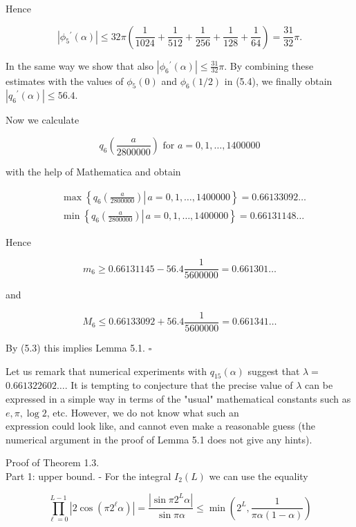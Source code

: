\documentclass[10pt]{article}
\begin{document}
Hence

$$
\left|\phi_{5}{ }^{\prime}(\alpha)\right| \leqslant 32 \pi\left(\frac{1}{1024}+\frac{1}{512}+\frac{1}{256}+\frac{1}{128}+\frac{1}{64}\right)=\frac{31}{32} \pi .
$$

In the same way we show that also $\left|\phi_{6}{ }^{\prime}(\alpha)\right| \leqslant \frac{31}{32} \pi$. By combining these estimates with the values of $\phi_{5}(0)$ and $\phi_{6}(1 / 2)$ in (5.4), we finally obtain $\left|q_{6}{ }^{\prime}(\alpha)\right| \leqslant 56.4$.

Now we calculate

$$
q_{6}\left(\frac{a}{2800000}\right) \text { for } a=0,1, \ldots, 1400000
$$

with the help of Mathematica and obtain

$$
\begin{aligned}
& \max \left\{\left.q_{6}\left(\frac{a}{2800000}\right) \right\rvert\, a=0,1, \ldots, 1400000\right\}=0.66133092 \ldots \\
& \min \left\{\left.q_{6}\left(\frac{a}{2800000}\right) \right\rvert\, a=0,1, \ldots, 1400000\right\}=0.66131148 \ldots
\end{aligned}
$$

Hence

$$
m_{6} \geqslant 0.66131145-56.4 \frac{1}{5600000}=0.661301 \ldots
$$

and

$$
M_{6} \leqslant 0.66133092+56.4 \frac{1}{5600000}=0.661341 \ldots
$$

By (5.3) this implies Lemma 5.1. \(\square\)

Let us remark that numerical experiments with $q_{15}(\alpha)$ suggest that $\lambda=$ $0.661322602 \ldots$. It is tempting to conjecture that the precise value of $\lambda$ can be expressed in a simple way in terms of the "usual" mathematical constants such as $e, \pi, \log 2$, etc. However, we do not know what such an\\
expression could look like, and cannot even make a reasonable guess (the numerical argument in the proof of Lemma 5.1 does not give any hints).

Proof of Theorem 1.3.\\
Part 1: upper bound. - For the integral $I_{2}(L)$ we can use the equality


\begin{equation*}
\prod_{\ell=0}^{L-1}\left|2 \cos \left(\pi 2^{\ell} \alpha\right)\right|=\frac{\left|\sin \pi 2^{L} \alpha\right|}{\sin \pi \alpha} \leqslant \min \left(2^{L}, \frac{1}{\pi \alpha(1-\alpha)}\right) \tag{5.5}
\end{equation*}
\end{document}
